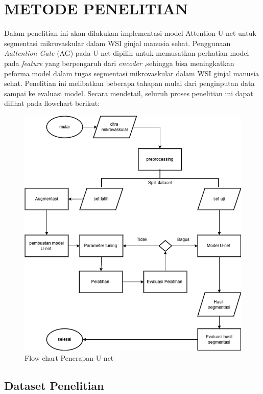 \chapter{METODE PENELITIAN}
\label{sec:metode-penelitian}

\noindent Dalam penelitian ini akan dilakukan implementasi model Attention U-net untuk segmentasi mikrovaskular dalam WSI ginjal manusia sehat.  Penggunaan \textit{Aattention Gate} (AG) pada U-net dipilih untuk memusatkan perhatian model pada \textit{feature} yang berpengaruh dari \textit{encoder} ,sehingga bisa meningkatkan peforma model dalam tugas segmentasi mikrovaskular dalam WSI ginjal manusia sehat. Penelitian ini melibatkan beberapa tahapan mulai dari penginputan data sampai ke evaluasi model. Secara mendetail, seluruh proses penelitian ini dapat dilihat pada flowchart berikut:

\begin{figure}[H]
	\centering
	\includegraphics[scale=.45]{gambar/flow-chart.png}
	\caption{Flow chart Penerapan U-net}
	\label{fig:flow-chart}
\end{figure}

\section{Dataset Penelitian}

